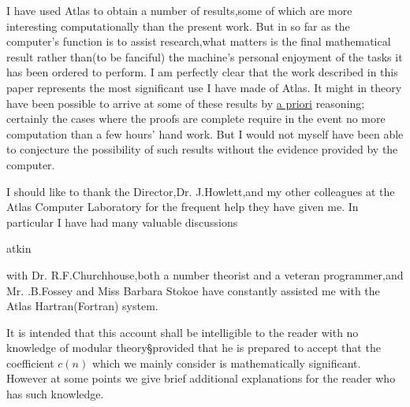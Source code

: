 I have used Atlas to obtain a number of results,some of which are more interesting computationally than the present work. But in so far as the computer's function is to assist research,what matters is the final mathematical result rather than(to be fanciful) the machine's personal enjoyment of the tasks it has been ordered to perform. I am perfectly clear that the work described in this paper represents the most significant use I have made of Atlas. It might in theory have been possible to arrive at some of these results by \uline{a priori} reasoning; certainly the cases where the proofs are complete require in the event no more computation than a few hours' hand work. But I would not myself have been able to conjecture the possibility of such results without the evidence provided by the computer.

I should like to thank the Director,Dr. J.Howlett,and my other colleagues at the Atlas Computer Laboratory for the frequent help they have given me. In particular I have had many valuable discussions


\noindent\hfill atkin 

\noindent with Dr. R.F.Churchhouse,both a number theorist and a veteran programmer,and Mr. .B.Fossey and Miss Barbara Stokoe have constantly assisted me with the Atlas Hartran(Fortran) system.

It is intended that this account shall be intelligible to the reader with no knowledge of modular theory\S{}\inserted{\handwritten{,}}provided that he is prepared to accept that the coefficient \uline{$c(n)$} which we mainly consider is mathematically significant. However at some points we give brief additional explanations for the reader who has such knowledge.

